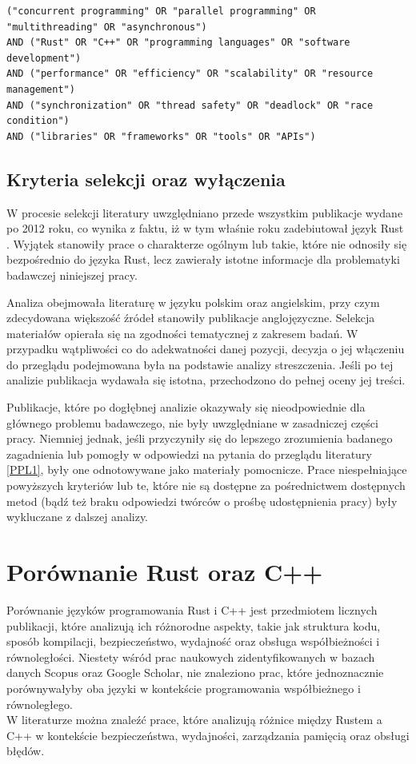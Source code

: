 \lstset{breaklines=true}
\begin{lstlisting}[caption=Kwerenda wygenerowana przez AI, label=AIQuery]
("concurrent programming" OR "parallel programming" OR "multithreading" OR "asynchronous")
AND ("Rust" OR "C++" OR "programming languages" OR "software development")
AND ("performance" OR "efficiency" OR "scalability" OR "resource management")
AND ("synchronization" OR "thread safety" OR "deadlock" OR "race condition")
AND ("libraries" OR "frameworks" OR "tools" OR "APIs")
\end{lstlisting}

\subsection{Kryteria selekcji oraz wyłączenia}
W procesie selekcji literatury uwzględniano przede wszystkim publikacje wydane po 2012 roku, co wynika z faktu, iż w tym właśnie roku zadebiutował język Rust \cite{wikipediaRustprogramming}. Wyjątek stanowiły prace o charakterze ogólnym lub takie, które nie odnosiły się bezpośrednio do języka Rust, lecz zawierały istotne informacje dla problematyki badawczej niniejszej pracy.

Analiza obejmowała literaturę w języku polskim oraz angielskim, przy czym zdecydowana większość źródeł stanowiły publikacje anglojęzyczne. Selekcja materiałów opierała się na zgodności tematycznej z zakresem badań. W przypadku wątpliwości co do adekwatności danej pozycji, decyzja o jej włączeniu do przeglądu podejmowana była na podstawie analizy streszczenia. Jeśli po tej analizie publikacja wydawała się istotna, przechodzono do pełnej oceny jej treści.

Publikacje, które po dogłębnej analizie okazywały się nieodpowiednie dla głównego problemu badawczego, nie były uwzględniane w zasadniczej części pracy. Niemniej jednak, jeśli przyczyniły się do lepszego zrozumienia badanego zagadnienia lub pomogły w odpowiedzi na pytania do przeglądu literatury \ref{PPL1}, były one odnotowywane jako materiały pomocnicze. Prace niespełniające powyższych kryteriów lub te, które nie są dostępne za pośrednictwem dostępnych metod (bądź też braku odpowiedzi twórców o prośbę udostępnienia pracy) były wykluczane z dalszej analizy.

\section{Porównanie Rust oraz C++}
Porównanie języków programowania Rust i C++ jest przedmiotem licznych publikacji, które analizują ich różnorodne aspekty, takie jak struktura kodu, sposób kompilacji, bezpieczeństwo, wydajność oraz obsługa współbieżności i równoległości. Niestety wśród prac naukowych zidentyfikowanych w bazach danych Scopus oraz Google Scholar, nie znaleziono prac, które jednoznacznie porównywałyby oba języki w kontekście programowania współbieżnego i równoległego.\\
W literaturze można znaleźć prace, które analizują różnice między Rustem a C++ w kontekście bezpieczeństwa, wydajności, zarządzania pamięcią oraz obsługi błędów.

